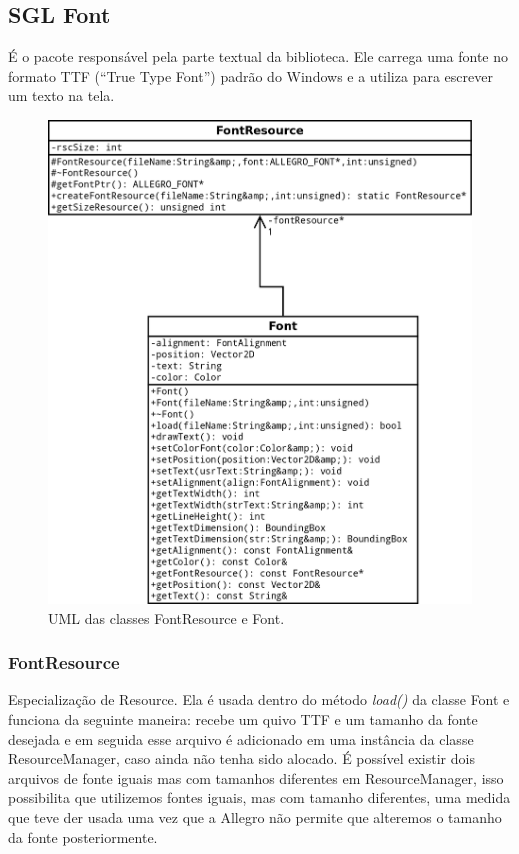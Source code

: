 \subsection{SGL Font}
%
%
É o pacote responsável pela parte textual da biblioteca. Ele carrega uma fonte no formato TTF (``True Type Font'') padrão do Windows e a utiliza para escrever um texto na tela.
%
%
%
\begin{figure}[H]
    \centering
    \includegraphics[scale = 0.20]{uml/Font.png}
    \caption{UML das classes FontResource e Font.}
    \label{Font}
\end{figure}
%
%
\subsubsection{FontResource}
%
%
Especialização de Resource. Ela é usada dentro do método \textit{load()} da classe Font e funciona da seguinte maneira: recebe um quivo TTF e um tamanho da fonte desejada e em seguida esse arquivo é adicionado em uma instância da classe ResourceManager, caso ainda não tenha sido alocado. É possível existir dois arquivos de fonte iguais mas com tamanhos diferentes em ResourceManager, isso possibilita que utilizemos fontes iguais, mas com tamanho diferentes, uma medida que teve der usada uma vez que a Allegro não permite que alteremos o tamanho da fonte posteriormente.
%
%
